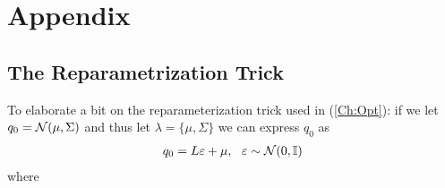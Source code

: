 \appendix
\section{Appendix}

\subsection{The Reparametrization Trick}
To elaborate a bit on the reparameterization trick used in (\ref{Ch:Opt}): if we let $q_0=\mathcal{N}(\mu,\Sigma)$ and thus let $\lambda=\{\mu,\Sigma\}$ we can express $q_0$ as 
\begin{align*}
    q_0 = L\varepsilon + \mu, \ \ \varepsilon \sim \mathcal{N}(0,\mathbb{I}) 
\end{align*}
where 

